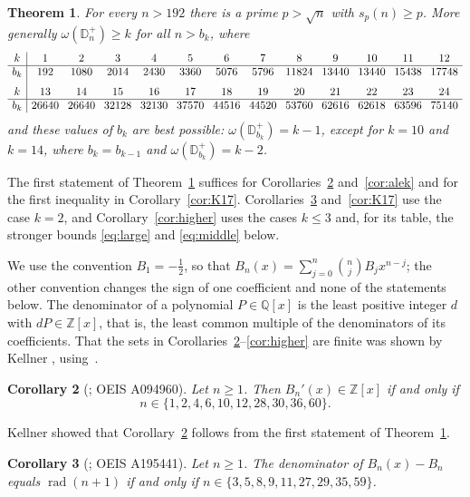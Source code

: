 \documentclass[11pt]{amsart}
\newtheorem{theorem}{Theorem}
\newtheorem{corollary}[theorem]{Corollary}
\theoremstyle{remark}
\numberwithin{equation}{section}
\newcommand{\ZZ}{\mathbb Z}
\newcommand{\Dp}{\mathbb D^{+}}
\begin{document}
\begin{theorem}\label{thm:main}
For every $n>192$ there is a prime $p>\sqrt n$ with $s_p(n)\ge p$. More generally $\omega(\Dp_n)\ge k$ for all $n>b_k$, where
\[
\setlength{\arraycolsep}{4pt}
\begin{array}{c|cccccccccccc}
k&1&2&3&4&5&6&7&8&9&10&11&12\\ \hline
b_k&192&1080&2014&2430&3360&5076&5796&11824&13440&13440&15438&17748\\[6pt]
k&13&14&15&16&17&18&19&20&21&22&23&24\\ \hline
b_k&26640&26640&32128&32130&37570&44516&44520&53760&62616&62618&63596&75140
\end{array}
\]
and these values of $b_k$ are best possible: $\omega(\Dp_{b_k})=k-1$, except for $k=10$ and $k=14$, where $b_k=b_{k-1}$ and
$\omega(\Dp_{b_k})=k-2$.
\end{theorem}

The first statement of Theorem~\ref{thm:main} suffices for Corollaries~\ref{cor:first} and~\ref{cor:alek} and for the first inequality
in Corollary~\ref{cor:K17}. Corollaries~\ref{cor:R} and~\ref{cor:K17} use the case $k=2$, and Corollary~\ref{cor:higher} uses the cases
$k\le3$ and, for its table, the stronger bounds \eqref{eq:large} and \eqref{eq:middle} below.

We use the convention $B_1=-\frac12$, so that $B_n(x)=\sum_{j=0}^n\binom njB_jx^{n-j}$; the other convention changes the sign of one
coefficient and none of the statements below. The denominator of a polynomial $P\in\mathbb Q[x]$ is the least positive integer $d$ with
$dP\in\ZZ[x]$, that is, the least common multiple of the denominators of its coefficients. That the sets in
Corollaries~\ref{cor:first}--\ref{cor:higher} are finite was shown by Kellner \cite[Corollary 4, Theorems 10 and 14]{K24}, using~\cite{BLMS}.

\begin{corollary}[{\cite[Conjecture 1(ii)]{K24}; OEIS A094960}]\label{cor:first}
Let $n\ge1$. Then $B_n'(x)\in\ZZ[x]$ if and only if
\[
n\in\{1,2,4,6,10,12,28,30,36,60\}.
\]
\end{corollary}

Kellner \cite[Theorem 3]{K24} showed that Corollary~\ref{cor:first} follows from the first statement of Theorem~\ref{thm:main}.

\begin{corollary}[{\cite[Conjecture 11]{K24}; OEIS A195441}]\label{cor:R}
Let $n\ge1$. The denominator of $B_n(x)-B_n$ equals $\operatorname{rad}(n+1)$ if and only if $n\in\{3,5,8,9,11,27,29,35,59\}$.
\end{corollary}
\end{document}

